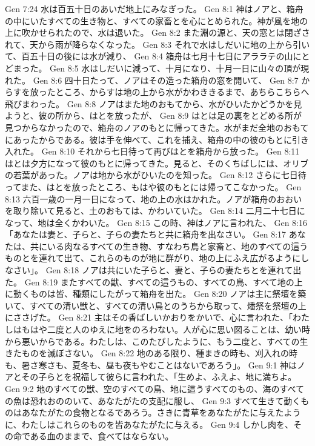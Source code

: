 Gen 7:24  水は百五十日のあいだ地上にみなぎった。
Gen 8:1  神はノアと、箱舟の中にいたすべての生き物と、すべての家畜とを心にとめられた。神が風を地の上に吹かせられたので、水は退いた。
Gen 8:2  また淵の源と、天の窓とは閉ざされて、天から雨が降らなくなった。
Gen 8:3  それで水はしだいに地の上から引いて、百五十日の後には水が減り、
Gen 8:4  箱舟は七月十七日にアララテの山にとどまった。
Gen 8:5  水はしだいに減って、十月になり、十月一日に山々の頂が現れた。
Gen 8:6  四十日たって、ノアはその造った箱舟の窓を開いて、
Gen 8:7  からすを放ったところ、からすは地の上から水がかわききるまで、あちらこちらへ飛びまわった。
Gen 8:8  ノアはまた地のおもてから、水がひいたかどうかを見ようと、彼の所から、はとを放ったが、
Gen 8:9  はとは足の裏をとどめる所が見つからなかったので、箱舟のノアのもとに帰ってきた。水がまだ全地のおもてにあったからである。彼は手を伸べて、これを捕え、箱舟の中の彼のもとに引き入れた。
Gen 8:10  それから七日待って再びはとを箱舟から放った。
Gen 8:11  はとは夕方になって彼のもとに帰ってきた。見ると、そのくちばしには、オリブの若葉があった。ノアは地から水がひいたのを知った。
Gen 8:12  さらに七日待ってまた、はとを放ったところ、もはや彼のもとには帰ってこなかった。
Gen 8:13  六百一歳の一月一日になって、地の上の水はかれた。ノアが箱舟のおおいを取り除いて見ると、土のおもては、かわいていた。
Gen 8:14  二月二十七日になって、地は全くかわいた。
Gen 8:15  この時、神はノアに言われた、
Gen 8:16  「あなたは妻と、子らと、子らの妻たちと共に箱舟を出なさい。
Gen 8:17  あなたは、共にいる肉なるすべての生き物、すなわち鳥と家畜と、地のすべての這うものとを連れて出て、これらのものが地に群がり、地の上にふえ広がるようにしなさい」。
Gen 8:18  ノアは共にいた子らと、妻と、子らの妻たちとを連れて出た。
Gen 8:19  またすべての獣、すべての這うもの、すべての鳥、すべて地の上に動くものは皆、種類にしたがって箱舟を出た。
Gen 8:20  ノアは主に祭壇を築いて、すべての清い獣と、すべての清い鳥とのうちから取って、燔祭を祭壇の上にささげた。
Gen 8:21  主はその香ばしいかおりをかいで、心に言われた、「わたしはもはや二度と人のゆえに地をのろわない。人が心に思い図ることは、幼い時から悪いからである。わたしは、このたびしたように、もう二度と、すべての生きたものを滅ぼさない。
Gen 8:22  地のある限り、種まきの時も、刈入れの時も、暑さ寒さも、夏冬も、昼も夜もやむことはないであろう」。
Gen 9:1  神はノアとその子らとを祝福して彼らに言われた、「生めよ、ふえよ、地に満ちよ。
Gen 9:2  地のすべての獣、空のすべての鳥、地に這うすべてのもの、海のすべての魚は恐れおののいて、あなたがたの支配に服し、
Gen 9:3  すべて生きて動くものはあなたがたの食物となるであろう。さきに青草をあなたがたに与えたように、わたしはこれらのものを皆あなたがたに与える。
Gen 9:4  しかし肉を、その命である血のままで、食べてはならない。

